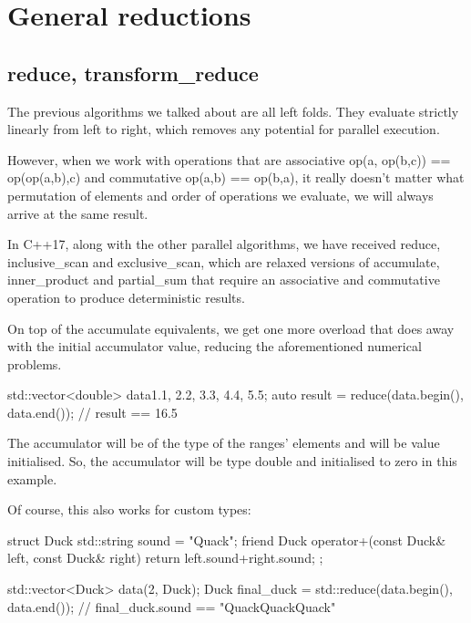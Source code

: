 \section{General reductions}

\subsection{reduce, transform\_reduce}

The previous algorithms we talked about are all left folds. They evaluate strictly linearly from left to right, which removes any potential for parallel execution.

However, when we work with operations that are associative op(a, op(b,c)) == op(op(a,b),c) and commutative op(a,b) == op(b,a), it really doesn’t matter what permutation of elements and order of operations we evaluate, we will always arrive at the same result.

In C++17, along with the other parallel algorithms, we have received reduce, inclusive\_scan and exclusive\_scan, which are relaxed versions of accumulate, inner\_product and partial\_sum that require an associative and commutative operation to produce deterministic results.



On top of the accumulate equivalents, we get one more overload that does away with the initial accumulator value, reducing the aforementioned numerical problems.

\begin{box-note}
\begin{cppcode}
std::vector<double> data{1.1, 2.2, 3.3, 4.4, 5.5};
auto result = reduce(data.begin(), data.end());
// result == 16.5
\end{cppcode}
\end{box-note}

The accumulator will be of the type of the ranges’ elements and will be value initialised. So, the accumulator will be type double and initialised to zero in this example.

Of course, this also works for custom types:

\begin{box-note}
\begin{cppcode}
struct Duck {
    std::string sound = "Quack";
    friend Duck operator+(const Duck& left, const Duck& right) {
        return {left.sound+right.sound};
    }
};

std::vector<Duck> data(2, Duck{});
Duck final_duck = std::reduce(data.begin(), data.end());
// final_duck.sound == "QuackQuackQuack"
\end{cppcode}
\end{box-note}

